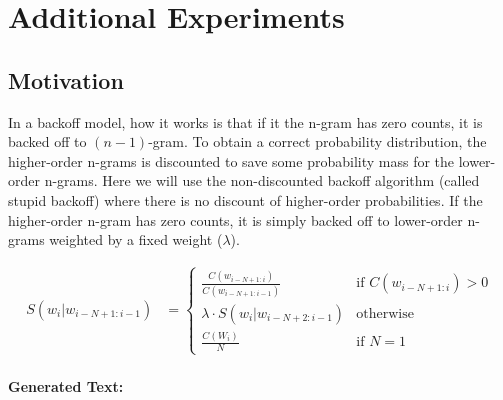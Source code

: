 \section{Additional Experiments}\label{sec:backoff}

\subsection{Motivation \cite{n-gram:ch3}}
In a backoff model, how it works is that if it the n-gram has zero counts, it is backed off to $(n-1)$-gram.
To obtain a correct probability distribution, the higher-order n-grams is discounted to save some probability mass for the lower-order n-grams. 
Here we will use the non-discounted backoff algorithm (called stupid backoff) where there is no discount of higher-order probabilities.
If the higher-order n-gram has zero counts, it is simply backed off to lower-order n-grams weighted by a fixed weight ($\lambda$).

\begin{align}
    S(w_i | w_{i-N+1:i-1}) &= \begin{cases}
        \frac{C(w_{i-N+1:i})}{C(w_{i-N+1:i-1})} & \text{if } C(w_{i-N+1:i}) > 0\\
        \lambda \cdot S(w_i | w_{i-N+2:i-1}) & \text{otherwise}\\
        \frac{C(W_i)}{N} & \text{if } N = 1
    \end{cases}
\end{align}

\paragraph{Generated Text:}
\texttt{}